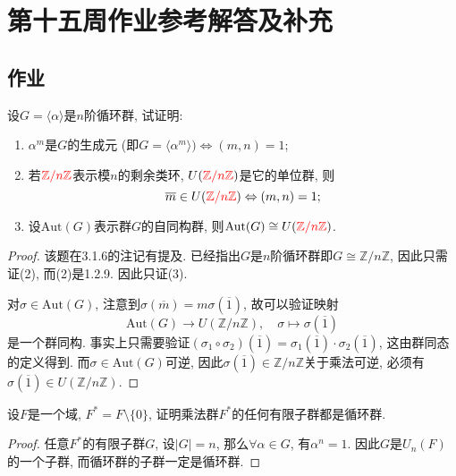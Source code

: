 \documentclass{../solutions-cn}
\begin{document}
\section*{第十五周作业参考解答及补充}

\subsection*{作业}

\begin{exercise}[习题4.3.1]
    设$G = \langle \alpha \rangle$是$n$阶循环群, 试证明: 
    \begin{enumerate}[(1)]
        \item $\alpha^m$是$G$的生成元 (即$G = \langle \alpha^m \rangle ) \Leftrightarrow (m, n) = 1$;
        \item 若$\textcolor{red}{\mathbb{Z}/n\mathbb{Z}}$表示模$n$的剩余类环, $U(\textcolor{red}{\mathbb{Z}/n\mathbb{Z}})$是它的单位群, 则
        \[
            \overline{m} \in U(\textcolor{red}{\mathbb{Z}/n\mathbb{Z}}) \Leftrightarrow (m, n)=1;
        \]
        \item 设$\mathrm{Aut}(G)$表示群$G$的自同构群, 则$\mathrm{Aut}(G) \cong U(\textcolor{red}{\mathbb{Z}/n\mathbb{Z}})$.
    \end{enumerate}
\end{exercise}

\begin{proof}
    该题在3.1.6的注记有提及. 已经指出$G$是$n$阶循环群即$G \cong \mathbb{Z}/n\mathbb{Z}$, 因此只需证(2), 而(2)是1.2.9. 因此只证(3).

    对$\sigma \in \mathrm{Aut}(G)$, 注意到$\sigma(\overline{m}) = m\sigma(\overline{1})$, 故可以验证映射
    \[
        \mathrm{Aut}(G) \to U(\mathbb{Z}/n\mathbb{Z}),\quad \sigma \mapsto \sigma(\overline{1})
    \]
    是一个群同构. 事实上只需要验证$(\sigma_1 \circ \sigma_2)(\overline{1}) = \sigma_1(\overline{1})\cdot \sigma_2(\overline{1})$, 这由群同态的定义得到. 而$\sigma \in \mathrm{Aut}(G)$可逆, 因此$\sigma(\overline{1}) \in \mathbb{Z}/n\mathbb{Z}$关于乘法可逆, 必须有$\sigma(\overline{1}) \in U(\mathbb{Z}/n\mathbb{Z})$.
\end{proof}

\begin{exercise}[习题4.3.2]
    设$F$是一个域, $F^* = F \setminus \{0\}$, 证明乘法群$F^*$的任何有限子群都是循环群.
\end{exercise}

\begin{proof}
    任意$F^*$的有限子群$G$, 设$|G| = n$, 那么$\forall \alpha \in G$, 有$\alpha^n = 1$. 因此$G$是$U_n(F)$的一个子群, 而循环群的子群一定是循环群.
\end{proof}
\end{document}
